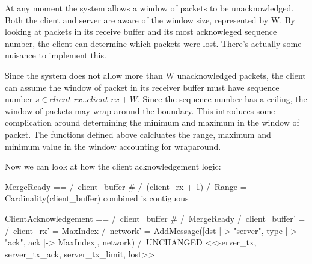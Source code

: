 At any moment the system allows a window of packets to be unacknowledged. Both
the client and server are aware of the window size, represented by W. By looking
at packets in its receive buffer and its most acknowleged sequence number, the
client can determine which packets were lost. There's actually some nuisance 
to implement this.\newline

Since the system does not allow more than W unacknowledged packets, the client
can assume the window of packet in its receiver buffer must have sequence number
$s \in client\_rx ..client\_rx+W$. Since the sequence number has a ceiling, the
window of packets may wrap around the boundary. This introduces some
complication around determining the minimum and maximum in the window of packet.
The functions defined above calcluates the range, maximum and minimum value in
the window accounting for wraparound.\newline

Now we can look at how the client acknowledgement logic:\newline
\begin{tla}
MergeReady == 
    /\ client_buffer # {}
    /\ (client_rx + 1) %
    /\ Range = Cardinality(client_buffer)   \* combined is contiguous 

ClientAcknowledgement == 
    /\ client_buffer # {}
    /\ MergeReady 
    /\ client_buffer' = {}
    /\ client_rx' = MaxIndex
    /\ network' = AddMessage([dst |-> "server",
                              type |-> "ack",
                              ack |-> MaxIndex], 
                                network)
    /\ UNCHANGED <<server_tx, server_tx_ack, server_tx_limit, lost>>
\end{tla}
\begin{tlatex}
%
%
%
\@xx{}%
%
%
\@xx{}%
\@pvspace{8.0pt}%
%
%
%
%
%
\end{tlatex}
\newline

